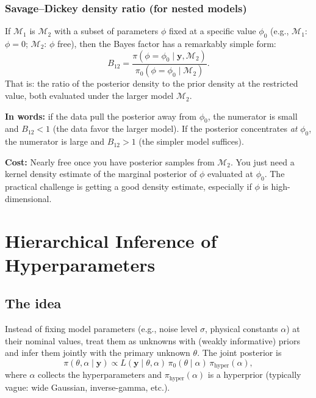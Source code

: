 \documentclass[11pt]{article}
\newcommand{\cM}{\mathcal{M}}
\theoremstyle{plain}
\theoremstyle{remark}
\theoremstyle{definition}
\begin{document}
\subsubsection{Savage--Dickey density ratio (for nested models)}
\label{sec:savage_dickey}

If $\cM_1$ is $\cM_2$ with a subset of parameters $\phi$ fixed at a 
specific value $\phi_0$ (e.g., $\cM_1$: $\phi = 0$; $\cM_2$: $\phi$ free), 
then the Bayes factor has a remarkably simple form:
\begin{equation}\label{eq:savage_dickey}
B_{12} = \frac{\pi(\phi = \phi_0 \mid \mathbf{y}, \cM_2)}{\pi_0(\phi = \phi_0 \mid \cM_2)}.
\end{equation}
That is: the ratio of the posterior density to the prior density at the 
restricted value, both evaluated under the larger model $\cM_2$.

\textbf{In words:} if the data pull the posterior away from $\phi_0$, the 
numerator is small and $B_{12} < 1$ (the data favor the larger model). If 
the posterior concentrates \emph{at} $\phi_0$, the numerator is large and 
$B_{12} > 1$ (the simpler model suffices).

\textbf{Cost:} Nearly free once you have posterior samples from $\cM_2$. 
You just need a kernel density estimate of the marginal posterior of $\phi$ 
evaluated at $\phi_0$. The practical challenge is getting a good density 
estimate, especially if $\phi$ is high-dimensional.


\section{Hierarchical Inference of Hyperparameters}\label{sec:hierarchical}

\subsection{The idea}

Instead of fixing model parameters (e.g., noise level $\sigma$, 
physical constants $\alpha$) at their nominal values, treat them as 
unknowns with (weakly informative) priors and infer them jointly with the 
primary unknown $\theta$. The joint posterior is
\begin{equation}\label{eq:hierarchical}
\pi(\theta, \alpha \mid \mathbf{y}) \propto 
L(\mathbf{y} \mid \theta, \alpha)\,\pi_0(\theta \mid \alpha)\,\pi_{\text{hyper}}(\alpha),
\end{equation}
where $\alpha$ collects the hyperparameters and $\pi_{\text{hyper}}(\alpha)$ 
is a hyperprior (typically vague: wide Gaussian, inverse-gamma, etc.).
\end{document}
